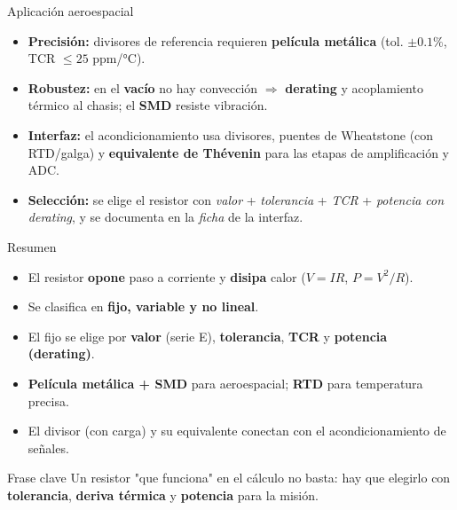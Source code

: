 \documentclass[aspectratio=169]{beamer}
\begin{document}
\begin{frame}{Aplicación aeroespacial}
  \begin{itemize}
    \item \textbf{Precisión:} divisores de referencia requieren \textbf{película metálica}
      (tol. $\pm0.1\text{\%}$, TCR $\le 25$ ppm/°C).
    \item \textbf{Robustez:} en el \textbf{vacío} no hay convección $\Rightarrow$ \textbf{derating}
      y acoplamiento térmico al chasis; el \textbf{SMD} resiste vibración.
    \item \textbf{Interfaz:} el acondicionamiento usa divisores, puentes de Wheatstone
      (con RTD/galga) y \textbf{equivalente de Thévenin} para las etapas de amplificación y ADC.
    \item \textbf{Selección:} se elige el resistor con \emph{valor} + \emph{tolerancia} +
      \emph{TCR} + \emph{potencia con derating}, y se documenta en la \emph{ficha} de la interfaz.
  \end{itemize}
\end{frame}

\begin{frame}{Resumen}
  \begin{itemize}
    \item El resistor \textbf{opone} paso a corriente y \textbf{disipa} calor ($V=IR$, $P=V^2/R$).
    \item Se clasifica en \textbf{fijo, variable y no lineal}.
    \item El fijo se elige por \textbf{valor} (serie E), \textbf{tolerancia}, \textbf{TCR} y \textbf{potencia (derating)}.
    \item \textbf{Película metálica + SMD} para aeroespacial; \textbf{RTD} para temperatura precisa.
    \item El divisor (con carga) y su equivalente conectan con el acondicionamiento de señales.
  \end{itemize}
  \pause
  \begin{block}{Frase clave}
    Un resistor "que funciona" en el cálculo no basta: hay que elegirlo con
    \textbf{tolerancia}, \textbf{deriva térmica} y \textbf{potencia} para la misión.
  \end{block}
\end{frame}
\end{document}
